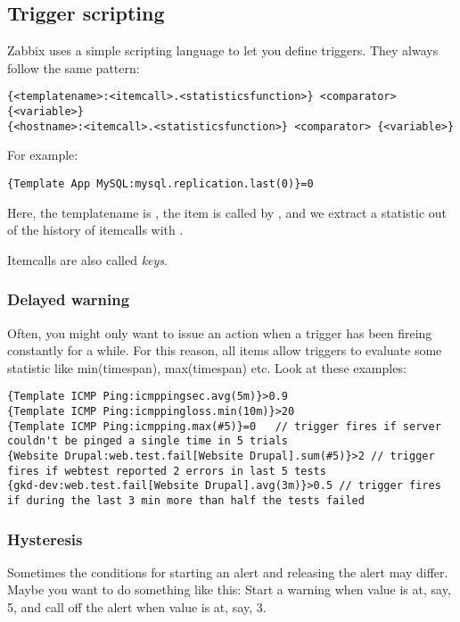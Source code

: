 \subsection{Trigger scripting}
Zabbix uses a simple scripting language to let you define triggers. They always follow the same pattern: 
\begin{lstlisting}
{<templatename>:<itemcall>.<statisticsfunction>} <comparator> {<variable>}
{<hostname>:<itemcall>.<statisticsfunction>} <comparator> {<variable>}
\end{lstlisting}

For example: 
\begin{lstlisting}
{Template App MySQL:mysql.replication.last(0)}=0
\end{lstlisting}

Here, the templatename is , the item is called by , and we extract a statistic out of the history of itemcalls with .

Itemcalls are also called \emph{keys}.

\subsubsection{Delayed warning}
Often, you might only want to issue an action when a trigger has been fireing constantly for a while. For this reason, all items allow triggers to evaluate some statistic like min(timespan), max(timespan) etc. Look at these examples: 
\begin{lstlisting}
{Template ICMP Ping:icmppingsec.avg(5m)}>0.9
{Template ICMP Ping:icmppingloss.min(10m)}>20   
{Template ICMP Ping:icmpping.max(#5)}=0   // trigger fires if server couldn't be pinged a single time in 5 trials
{Website Drupal:web.test.fail[Website Drupal].sum(#5)}>2 // trigger fires if webtest reported 2 errors in last 5 tests
{gkd-dev:web.test.fail[Website Drupal].avg(3m)}>0.5 // trigger fires if during the last 3 min more than half the tests failed
\end{lstlisting}


\subsubsection{Hysteresis}
Sometimes the conditions for starting an alert and releasing the alert may differ. Maybe you want to do something like this: Start a warning when value is at, say, 5, and call off the alert when value is at, say, 3. 

